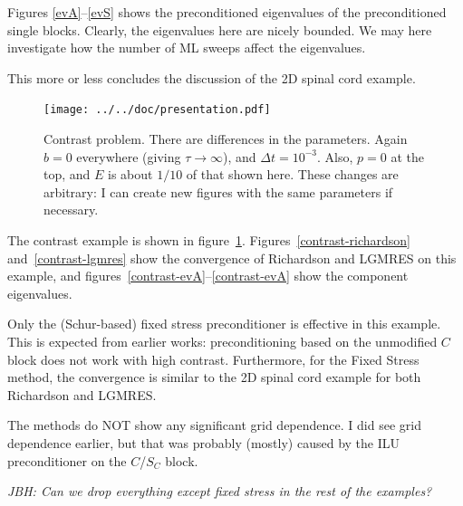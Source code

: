 \documentclass{article}
\begin{document}
Figures \ref{evA}--\ref{evS} shows the preconditioned eigenvalues of the
preconditioned single blocks. Clearly, the eigenvalues here are nicely
bounded. We may here investigate how the number of ML sweeps affect the
eigenvalues.

This more or less concludes the discussion of the 2D spinal cord example. 

\FloatBarrier

\begin{figure}
\begin{center}
\texttt{[image: ../../doc/presentation.pdf]}
\caption{Contrast problem. There are differences in the parameters. Again $b=0$ everywhere (giving $\tau\rightarrow\infty$), and $\Delta t=10^{-3}$. Also, $p=0$ at the top, and $E$ is about $1/10$ of that shown here. These changes are arbitrary: I can create new figures with the same parameters if necessary.}
\label{contrast}
\end{center}
\end{figure}

The contrast example is shown in figure~\ref{contrast}. Figures~\ref{contrast-richardson} and~\ref{contrast-lgmres} show the convergence of Richardson and LGMRES on this example, and figures~\ref{contrast-evA}--\ref{contrast-evA} show the component eigenvalues.

Only the (Schur-based) fixed stress preconditioner is effective in this example. This is expected from earlier works: preconditioning based on the unmodified $C$ block does not work with high contrast. Furthermore, for the Fixed Stress method, the convergence is similar to the 2D spinal cord example for both Richardson and LGMRES.

The methods do NOT show any significant grid dependence. I did see grid dependence earlier, but that was probably (mostly) caused by the ILU preconditioner on the $C$/$S_C$ block.

\emph{JBH: Can we drop everything except fixed stress in the rest of the examples?}
\end{document}
